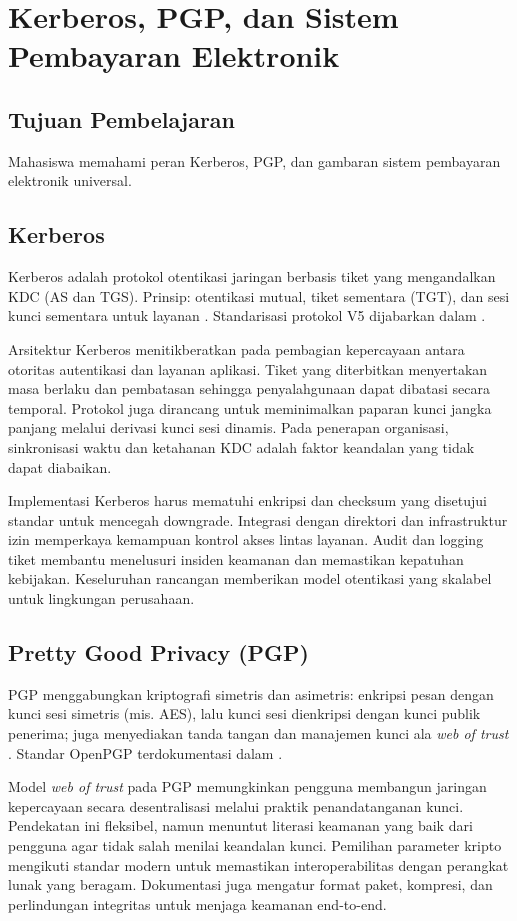 \documentclass[../main.tex]{subfiles}
\begin{document}
\chapter{Kerberos, PGP, dan Sistem Pembayaran Elektronik}

\section{Tujuan Pembelajaran}
Mahasiswa memahami peran Kerberos, PGP, dan gambaran sistem pembayaran elektronik universal.

\section{Kerberos}
Kerberos adalah protokol otentikasi jaringan berbasis tiket yang mengandalkan KDC (AS dan TGS). Prinsip: otentikasi mutual, tiket sementara (TGT), dan sesi kunci sementara untuk layanan \citep{kerberos,stallings}. Standarisasi protokol V5 dijabarkan dalam \citep{rfc4120}.

Arsitektur Kerberos menitikberatkan pada pembagian kepercayaan antara otoritas autentikasi dan layanan aplikasi. Tiket yang diterbitkan menyertakan masa berlaku dan pembatasan sehingga penyalahgunaan dapat dibatasi secara temporal. Protokol juga dirancang untuk meminimalkan paparan kunci jangka panjang melalui derivasi kunci sesi dinamis. Pada penerapan organisasi, sinkronisasi waktu dan ketahanan KDC adalah faktor keandalan yang tidak dapat diabaikan.

Implementasi Kerberos harus mematuhi enkripsi dan checksum yang disetujui standar untuk mencegah downgrade. Integrasi dengan direktori dan infrastruktur izin memperkaya kemampuan kontrol akses lintas layanan. Audit dan logging tiket membantu menelusuri insiden keamanan dan memastikan kepatuhan kebijakan. Keseluruhan rancangan memberikan model otentikasi yang skalabel untuk lingkungan perusahaan.

\section{Pretty Good Privacy (PGP)}
PGP menggabungkan kriptografi simetris dan asimetris: enkripsi pesan dengan kunci sesi simetris (mis. AES), lalu kunci sesi dienkripsi dengan kunci publik penerima; juga menyediakan tanda tangan dan manajemen kunci ala \emph{web of trust} \citep{pgp,stallings}. Standar OpenPGP terdokumentasi dalam \citep{rfc4880}.

Model \emph{web of trust} pada PGP memungkinkan pengguna membangun jaringan kepercayaan secara desentralisasi melalui praktik penandatanganan kunci. Pendekatan ini fleksibel, namun menuntut literasi keamanan yang baik dari pengguna agar tidak salah menilai keandalan kunci. Pemilihan parameter kripto mengikuti standar modern untuk memastikan interoperabilitas dengan perangkat lunak yang beragam. Dokumentasi juga mengatur format paket, kompresi, dan perlindungan integritas untuk menjaga keamanan end-to-end.
\end{document}
